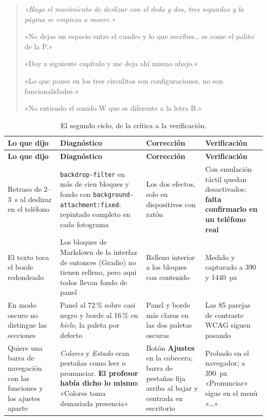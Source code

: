 \documentclass[11pt,a4paper]{article}
\newcommand{\cod}[1]{\texttt{\small #1}}
\begin{document}
\begin{quote}\itshape
«Hago el movimiento de deslizar con el dedo y dos, tres segundos y la página se empieza
a mover.»\par\medskip
«No dejas un espacio entre el cuadro y lo que escribes\dots{} se come el palito de la
P.»\par\medskip
«Doy a siguiente capítulo y me deja ahí mismo abajo.»\par\medskip
«Lo que pones en los tres circulitos son configuraciones, no son funcionalidades.»\par\medskip
«No entiendo el sonido W que es diferente a la letra B.»
\end{quote}

\begin{small}
\begin{longtable}{@{}L{3.1cm} L{3.8cm} L{4.2cm} L{2.8cm}@{}}
\toprule
\textbf{Lo que dijo} & \textbf{Diagnóstico} & \textbf{Corrección} & \textbf{Verificación} \\
\midrule
\endfirsthead
\toprule
\textbf{Lo que dijo} & \textbf{Diagnóstico} & \textbf{Corrección} & \textbf{Verificación} \\
\midrule
\endhead
\bottomrule
\endfoot
\bottomrule
\caption{El segundo ciclo, de la crítica a la verificación.}
\label{cuad:laura}
\endlastfoot
Retraso de 2--3~s al deslizar en el teléfono & \cod{backdrop-filter} en más de cien bloques y fondo con \cod{background-\allowbreak attachment:\allowbreak fixed}: repintado completo en cada fotograma & Los dos efectos, solo en dispositivos con ratón & Con emulación táctil quedan desactivados; \textbf{falta confirmarlo en un teléfono real} \\
\addlinespace
El texto toca el borde redondeado & Los bloques de Markdown de la interfaz de entonces (Gradio) no tienen relleno, pero aquí todos llevan fondo de panel & Relleno interior a los bloques con contenido & Medido y capturado a 390 y 1440~px \\
\addlinespace
En modo oscuro no distingue las secciones & Panel al 72\,\% sobre casi negro y borde al 16\,\% en \emph{hielo}, la paleta por defecto & Panel y borde más claros en las dos paletas oscuras & Las 85 parejas de contraste WCAG siguen pasando \\
\addlinespace
Quiere una barra de navegación con las funciones y los ajustes aparte & \emph{Colores} y \emph{Estado} eran pestañas como leer o pronunciar. \textbf{El profesor había dicho lo mismo}: «Colores toma demasiada presencia» & Botón \textbf{Ajustes} en la cabecera; barra de pestañas fija arriba al bajar y centrada en escritorio & Probado en el navegador; a 390~px «Pronunciar» sigue en el menú «\dots» \\

\end{longtable}
\end{small}
\end{document}

